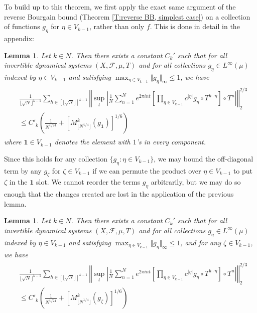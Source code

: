 \documentclass[11pt, oneside]{amsart}   	%
\newcommand{\1}{\mathbbm{1}}
\newcommand{\floor}[1]{\lfloor#1\rfloor}
\newtheorem{lemma}[theorem]{Lemma}
\theoremstyle{definition}
\begin{document}
To build up to this theorem, we first apply the exact same argument of the reverse Bourgain bound (Theorem \ref{T:reverse BB, simplest case}) on a collection of functions $g_\eta$ for $\eta\in V_{k-1}$, rather than only $f$. This is done in detail in the appendix:
\begin{lemma}\label{L:RBB for off-diag}
Let $k\in N$. Then there exists a constant $C_k'$ such that for all invertible dynamical systems $(X, \mathcal{F}, \mu, T)$ and for all collections $g_\eta \in L^\infty(\mu)$ indexed by $\eta \in V_{k-1}$ and satisfying $\max_{\eta\in V_{k-1}}\Vert g_\eta \Vert_\infty \leq 1$, we have
\begin{align}
\begin{split}
&\frac{1}{\floor{\sqrt{N}}^{k-1}} \sum_{h \in [\floor{\sqrt{N}}]^{k-1}} \left\Vert\sup_t \left| \frac{1}{N} \sum_{n=1}^N e^{2\pi i n t} \left[ \prod_{\eta \in V_{k-1}} c^{|\eta|} g_\eta \circ T^{h \cdot \eta}\right] \circ T^n\right| \right\Vert_2^{2/3} \\ &\leq C'_k \left(\frac{1}{N^{1/24}} + \left[M_{\floor{N^{1/4}}}^k(g_\textbf{1})\right]^{1/6} \right)
\end{split}
\end{align}
where $\textbf{1}\in V_{k-1}$ denotes the element with $1$'s in every component.
\end{lemma}

Since this holds for any collection $\{g_\eta : \eta\in V_{k-1}\}$, we may bound the off-diagonal term by any $g_\zeta$ for $\zeta\in V_{k-1}$ if we can permute the product over $\eta\in V_{k-1}$ to put $\zeta$ in the $\textbf{1}$ slot. We cannot reorder the terms $g_\eta$ arbitrarily, but we may do so enough that the changes created are lost in the application of the previous lemma. 

\begin{lemma}\label{L:permutation for off-diag}
Let $k\in N$. Then there exists a constant $C_k'$ such that for all invertible dynamical systems $(X, \mathcal{F}, \mu, T)$ and for all collections $g_\eta \in L^\infty(\mu)$ indexed by $\eta \in V_{k-1}$ and satisfying $\max_{\eta\in V_{k-1}}\Vert g_\eta \Vert_\infty \leq 1$, and for any $\zeta\in V_{k-1}$, we have
\begin{align}
\begin{split}
&\frac{1}{\floor{\sqrt{N}}^{k-1}} \sum_{h \in [\floor{\sqrt{N}}]^{k-1}} \left\Vert\sup_t \left| \frac{1}{N} \sum_{n=1}^N e^{2\pi i n t} \left[ \prod_{\eta \in V_{k-1}} c^{|\eta|} g_\eta \circ T^{h \cdot \eta}\right] \circ T^n\right| \right\Vert_2^{2/3} \\ &\leq C'_k \left(\frac{1}{N^{1/24}} + \left[M_{\floor{N^{1/4}}}^k(g_\zeta)\right]^{1/6} \right)
\end{split}
\end{align}
\end{lemma}
\end{document}
